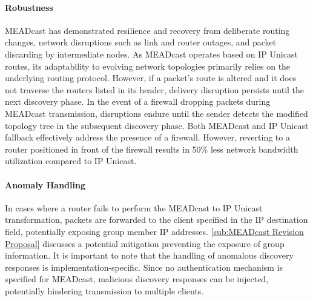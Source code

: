 \begin{itemize}
    \paragraph{Robustness}
    MEADcast has demonstrated resilience and recovery from deliberate routing
        changes, network disruptions such as link and router outages, and
        packet discarding by intermediate nodes.
    As MEADcast operates based on IP Unicast routes, its adaptability to
        evolving network topologies primarily relies on the underlying routing
        protocol.
    However, if a packet's route is altered and it does not traverse the
        routers listed in its header, delivery disruption persists until the
        next discovery phase.
    In the event of a firewall dropping packets during MEADcast transmission,
        disruptions endure until the sender detects the modified topology tree
        in the subsequent discovery phase.
    Both MEADcast and IP Unicast fallback effectively address the presence of
        a firewall.
    However, reverting to a router positioned in front of the firewall results
        in 50\% less network bandwidth utilization compared to IP Unicast.

    \paragraph{Anomaly Handling}
    In cases where a router fails to perform the MEADcast to IP Unicast
        transformation, packets are forwarded to the client specified in the IP
        destination field, potentially exposing group member IP addresses.
    \autoref{sub:MEADcast Revision Proposal} discusses a potential mitigation
        preventing the exposure of group information.
    It is important to note that the handling of anomalous discovery responses
        is implementation-specific.
    Since no authentication mechanism is specified for MEADcast, malicious
        discovery responses can be injected, potentially hindering transmission
        to multiple clients.


\end{itemize}

